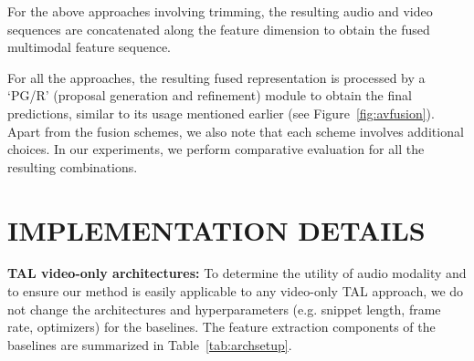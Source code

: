 \documentclass[10pt,twocolumn,letterpaper]{article}
\begin{document}
For the above approaches involving trimming, the resulting audio and video sequences are concatenated along the feature dimension to obtain the fused multimodal feature sequence. 

For all the approaches, the resulting fused representation is processed by a `PG/R' (proposal generation and refinement) module to obtain the final predictions, similar to its usage mentioned earlier (see Figure~\ref{fig:avfusion}). Apart from the fusion schemes, we also note that each scheme involves additional choices. In our experiments, we perform comparative evaluation for all the resulting combinations.

\section{\uppercase{Implementation Details}}
\label{sec:Implement}

\noindent \textbf{TAL video-only architectures:} To determine the utility of audio modality and to ensure our method is easily applicable to any video-only TAL approach, we do not change the architectures and hyperparameters (e.g. snippet length, frame rate, optimizers) for the baselines. The feature extraction components of the baselines are summarized in Table~\ref{tab:archsetup}.
\end{document}
